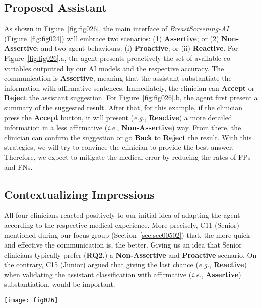 \subsection{Proposed Assistant}
\label{sec:sec00702}

As shown in Figure~\ref{fig:fig026}, the main interface of {\it BreastScreening-AI} (Figure~\ref{fig:fig024}) will embrace two scenarios: (1) {\bf Assertive}; or (2) {\bf Non-Assertive}; and two agent behaviours: (i) {\bf Proactive}; or (ii) {\bf Reactive}.
For Figure~\ref{fig:fig026}.a, the agent presents proactively the set of available co-variables outputted by our AI models and the respective accuracy.
The communication is {\bf Assertive}, meaning that the assistant substantiate the information with affirmative sentences.
Immediately, the clinician can {\bf Accept} or {\bf Reject} the assistant suggestion.
For Figure~\ref{fig:fig026}.b, the agent first present a summary of the suggested result.
After that, for this example, if the clinician press the {\bf Accept} button, it will present ({\it e.g.}, {\bf Reactive}) a more detailed information in a less affirmative ({\it i.e.}, {\bf Non-Assertive}) way.
From there, the clinician can confirm the suggestion or go {\bf Back} to {\bf Reject} the result.
With this strategies, we will try to convince the clinician to provide the best answer.
Therefore, we expect to mitigate the medical error by reducing the rates of FPs and FNs.

\subsection{Contextualizing Impressions}
\label{sec:sec00703}

All four clinicians reacted positively to our initial idea of adapting the agent according to the respective medical experience.
More precisely, C11 (Senior) mentioned during our focus group (Section~\ref{sec:sec00502}) that, the more quick and effective the communication is, the better.
Giving us an idea that Senior clinicians typically prefer ({\bf RQ2.}) a {\bf Non-Assertive} and {\bf Proactive} scenario.
On the contrary, C15 (Junior) argued that giving the last chance ({\it e.g.}, {\bf Reactive}) when validating the assistant classification with affirmative ({\it i.e.}, {\bf Assertive}) substantiation, would be important.

\begin{figure*}[htbp]
\centering
\texttt{[image: fig026]}
\caption{Assistant agents with several scenarios and behaviours. We have the (a) first scenario, {\it i.e.}, an {\bf Assertive} agent with a {\bf Proactive} behaviour. Next, we have the (b) second scenario, {\it i.e.}, a {\bf Non-Assertive} agent with a {\bf Reactive} behaviour. In the {\bf Non-Assertive} scenario and {\bf Reactive} behaviour, the agent first show the (b1) summarized suggestion and then shows the (b2) detailed information.}
\label{fig:fig026}
\end{figure*}

